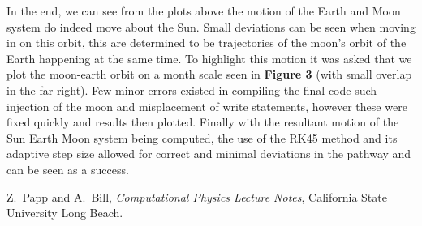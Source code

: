 \documentclass[12pt,letterpaper,notitlepage]{article}
\begin{document}
In the end, we can see from the plots above the motion of the Earth and Moon system do indeed move about the Sun. Small deviations can be seen when moving in on this orbit, this are determined to be trajectories of the moon's orbit of the Earth happening at the same time. To highlight this motion it was asked that we plot the moon-earth orbit on a month scale seen in \textbf{Figure 3} (with small overlap in the far right). Few minor errors existed in compiling the final code such injection of the moon and misplacement of write statements, however these were fixed quickly and results then plotted. Finally with the resultant motion of the Sun Earth Moon system being computed, the use of the RK45 method and its adaptive step size allowed for correct and minimal deviations in the pathway and can be seen as a success.     
\newpage
\begin{thebibliography}{}
	Z.~Papp and A.~Bill, {\it Computational Physics Lecture Notes}, California State University Long Beach.

\end{thebibliography}
\end{document}
